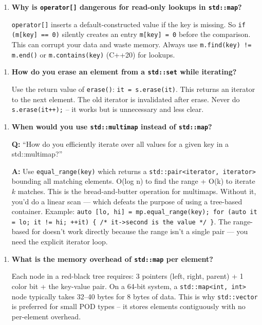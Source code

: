 \begin{enumerate}
\item \textbf{Why is \texttt{operator[]} dangerous for read-only lookups in \texttt{std::map}?}

\texttt{operator[]} inserts a default-constructed value if the key is missing. So \texttt{if (m[key] == 0)} silently creates an entry \texttt{m[key] = 0} before the comparison. This can corrupt your data and waste memory. Always use \texttt{m.find(key) != m.end()} or \texttt{m.contains(key)} (C++20) for lookups.
\end{enumerate}

\begin{enumerate}
\item \textbf{How do you erase an element from a \texttt{std::set} while iterating?}

Use the return value of \texttt{erase()}: \texttt{it = s.erase(it)}. This returns an iterator to the next element. The old iterator is invalidated after erase. Never do \texttt{s.erase(it++);} -- it works but is unnecessary and less clear.
\end{enumerate}

\begin{enumerate}
\item \textbf{When would you use \texttt{std::multimap} instead of \texttt{std::map}?}

\textbf{Q:} ``How do you efficiently iterate over all values for a given key in a std::multimap?''

\textbf{A:} Use \texttt{equal\_range(key)} which returns a \texttt{std::pair<iterator, iterator>} bounding all matching elements. O(log n) to find the range + O(k) to iterate $k$ matches. This is the bread-and-butter operation for multimaps. Without it, you'd do a linear scan --- which defeats the purpose of using a tree-based container. Example: \texttt{auto [lo, hi] = mp.equal\_range(key); for (auto it = lo; it != hi; ++it) \{ /* it->second is the value */ \}}. The range-based for doesn't work directly because the range isn't a single pair --- you need the explicit iterator loop.
\end{enumerate}

\begin{enumerate}
\item \textbf{What is the memory overhead of \texttt{std::map} per element?}

Each node in a red-black tree requires: 3 pointers (left, right, parent) + 1 color bit + the key-value pair. On a 64-bit system, a \texttt{std::map<int, int>} node typically takes 32--40 bytes for 8 bytes of data. This is why \texttt{std::vector} is preferred for small POD types -- it stores elements contiguously with no per-element overhead.
\end{enumerate}

